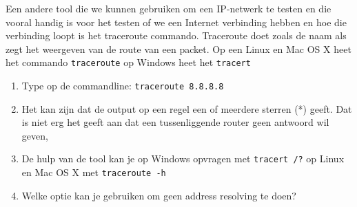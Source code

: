 Een andere tool die we kunnen gebruiken om een IP-netwerk te testen en die vooral handig is voor het testen of we een Internet verbinding hebben en hoe die verbinding loopt is het traceroute commando. Traceroute doet zoals de naam als zegt het weergeven van de route van een packet. Op een Linux en Mac OS X heet het commando \texttt{traceroute} op Windows heet het \texttt{tracert}

\begin{enumerate}
\item Type op de commandline: \texttt{traceroute 8.8.8.8}
\item Het kan zijn dat de output op een regel een of meerdere sterren (*) geeft. Dat is niet erg het geeft aan dat een tussenliggende router geen antwoord wil geven,
\item De hulp van de tool kan je op Windows opvragen met \texttt{tracert /?} op Linux en Mac OS X met \texttt{traceroute -h}
\item Welke optie kan je gebruiken om geen address resolving te doen?
\end{enumerate}
